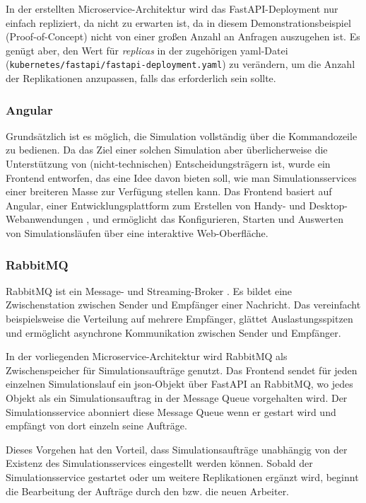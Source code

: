 \documentclass[11pt,a4paper]{article}
\begin{document}
In der erstellten Microservice-Architektur wird das FastAPI-Deployment nur einfach repliziert,
da nicht zu erwarten ist, da in diesem Demonstrationsbeispiel (Proof-of-Concept) nicht von einer
großen Anzahl an Anfragen auszugehen ist. Es genügt aber, den Wert für \emph{replicas} in der zugehörigen
yaml-Datei (\lstinline|kubernetes/fastapi/fastapi-deployment.yaml|) zu verändern, um die Anzahl der Replikationen anzupassen, 
falls das erforderlich sein sollte.

\subsubsection{Angular}
\label{sec:Angular}
Grundsätzlich ist es möglich, die Simulation vollständig über die Kommandozeile zu bedienen.
Da das Ziel einer solchen Simulation aber überlicherweise die Unterstützung von (nicht-technischen) 
Entscheidungsträgern ist, wurde ein Frontend entworfen, das eine Idee davon bieten soll, wie man Simulationsservices
einer breiteren Masse zur Verfügung stellen kann. Das Frontend basiert auf Angular,
einer Entwicklungsplattform zum Erstellen von Handy- und Desktop-Webanwendungen \cite{jain2014angularjs},
und ermöglicht das Konfigurieren, Starten und Auswerten von Simulationsläufen über eine interaktive Web-Oberfläche.


\subsubsection{RabbitMQ}
\label{sec:RabbitMQ}
RabbitMQ ist ein Message- und Streaming-Broker \cite{RabbitMQ}. Es bildet eine Zwischenstation
zwischen Sender und Empfänger einer Nachricht. Das vereinfacht beispielsweise die Verteilung auf 
mehrere Empfänger, glättet Auslastungsspitzen und ermöglicht asynchrone Kommunikation zwischen
Sender und Empfänger. 

In der vorliegenden Microservice-Architektur wird RabbitMQ als Zwischenspeicher für
Simulationsaufträge genutzt. Das Frontend sendet für jeden einzelnen Simulationslauf
ein json-Objekt über FastAPI an RabbitMQ, wo jedes Objekt als ein Simulationsauftrag
in der Message Queue vorgehalten wird. Der Simulationsservice abonniert diese Message Queue
wenn er gestart wird und empfängt von dort einzeln seine Aufträge.

Dieses Vorgehen hat den Vorteil, dass Simulationsaufträge unabhängig von der Existenz
des Simulationsservices eingestellt werden können. Sobald der Simulationsservice gestartet
oder um weitere Replikationen ergänzt wird, beginnt die Bearbeitung der Aufträge durch den
bzw. die neuen Arbeiter.
\end{document}

